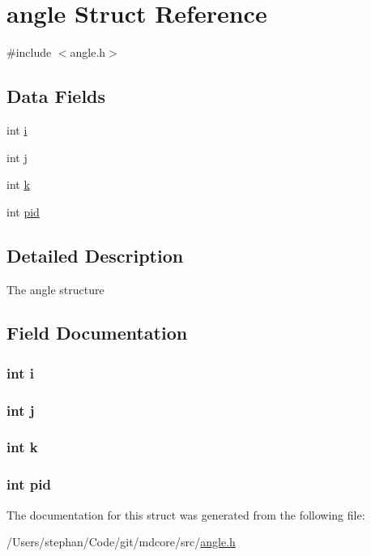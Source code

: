 \hypertarget{structangle}{\section{angle Struct Reference}
\label{structangle}
}


{\ttfamily \#include $<$angle.\-h$>$}

\subsection*{Data Fields}
\begin{DoxyCompactItemize}
\item 
int \hyperlink{structangle_acb559820d9ca11295b4500f179ef6392}{i}
\item 
int \hyperlink{structangle_a37d972ae0b47b9099e30983131d31916}{j}
\item 
int \hyperlink{structangle_ab66ed8e0098c0a86b458672a55a9cca9}{k}
\item 
int \hyperlink{structangle_af500917c052066b40cf47f96b43c607b}{pid}
\end{DoxyCompactItemize}


\subsection{Detailed Description}
The angle structure 

\subsection{Field Documentation}
\hypertarget{structangle_acb559820d9ca11295b4500f179ef6392}{
\subsubsection[{i}]{\setlength{\rightskip}{0pt plus 5cm}int i}}\label{structangle_acb559820d9ca11295b4500f179ef6392}
\hypertarget{structangle_a37d972ae0b47b9099e30983131d31916}{
\subsubsection[{j}]{\setlength{\rightskip}{0pt plus 5cm}int j}}\label{structangle_a37d972ae0b47b9099e30983131d31916}
\hypertarget{structangle_ab66ed8e0098c0a86b458672a55a9cca9}{
\subsubsection[{k}]{\setlength{\rightskip}{0pt plus 5cm}int k}}\label{structangle_ab66ed8e0098c0a86b458672a55a9cca9}
\hypertarget{structangle_af500917c052066b40cf47f96b43c607b}{
\subsubsection[{pid}]{\setlength{\rightskip}{0pt plus 5cm}int pid}}\label{structangle_af500917c052066b40cf47f96b43c607b}


The documentation for this struct was generated from the following file\-:\begin{DoxyCompactItemize}
\item 
/\-Users/stephan/\-Code/git/mdcore/src/\hyperlink{angle_8h}{angle.\-h}\end{DoxyCompactItemize}
